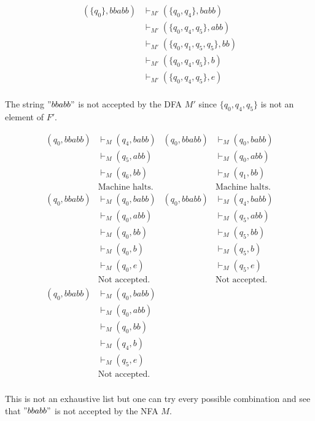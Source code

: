 \documentclass[12pt]{article}
\begin{document}
\begin{equation*}
\begin{split}
(\{q_0\}, bbabb) &\vdash_{M'} (\{q_0, q_4\}, babb) \\
&\vdash_{M'} (\{q_0, q_4, q_5\}, abb) \\
&\vdash_{M'} (\{q_0, q_1, q_5, q_5\}, bb) \\
&\vdash_{M'} (\{q_0, q_4, q_5\}, b) \\
&\vdash_{M'} (\{q_0, q_4, q_5\}, e) \\
\end{split}
\end{equation*}
\begin{center}
The string $"bbabb"$ is not accepted by the DFA $M'$ since $\{q_0, q_4, q_5\}$ is not an element of $F'$.
\end{center}

\begin{align*}
(q_0, bbabb) &\vdash_M (q_4, babb) & (q_0, bbabb) &\vdash_M (q_0, babb) \\
&\vdash_M (q_5, abb) & &\vdash_M (q_0, abb) \\
&\vdash_M (q_6, bb) & &\vdash_M (q_1, bb) \\
&\text{Machine halts.} & &\text{Machine halts.}  \\[5 pt]
(q_0, bbabb) &\vdash_M (q_0, babb) & (q_0, bbabb) &\vdash_M (q_4, babb)\\
&\vdash_M (q_0, abb) & &\vdash_M (q_5, abb) \\
&\vdash_M (q_0, bb) & &\vdash_M (q_5, bb) \\
&\vdash_M (q_0, b) & &\vdash_M (q_5, b) \\
&\vdash_M (q_0, e) & &\vdash_M (q_5, e) \\
&\text{Not accepted.} & &\text{Not accepted.}\\[5 pt]
(q_0, bbabb) &\vdash_M (q_0, babb) \\
&\vdash_M (q_0, abb) \\
&\vdash_M (q_0, bb) \\
&\vdash_M (q_4, b) \\
&\vdash_M (q_5, e) \\
&\text{Not accepted.} \\
\end{align*}
\begin{center}
This is not an exhaustive list but one can try every possible combination and see that $"bbabb"$ is not accepted by the NFA $M$.
\end{center}
\end{document}
